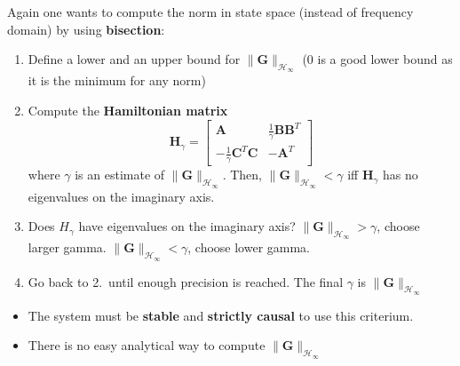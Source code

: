Again one wants to compute the norm in state space (instead of frequency domain) by using \textbf{bisection}:
\begin{enumerate}
    \item Define a lower and an upper bound for $\|\mathbf{G}\|_{\mathcal{H}_{\infty}}$ (0 is a good lower bound as it is the minimum for any norm)
    \item Compute the \textbf{Hamiltonian matrix}
          \begin{equation*}
              \mathbf{H}_{\gamma}=
              \begin{bmatrix}
                  \mathbf{A}                                & \frac{1}{\gamma}\mathbf{BB}^{T} \\
                  -\frac{1}{\gamma}\mathbf{C}^{T}\mathbf{C} & -\mathbf{A}^{T}
              \end{bmatrix}
          \end{equation*}
          where $\gamma$ is an estimate of $\|\mathbf{G}\|_{\mathcal{H}_{\infty}}$. Then, $\|\mathbf{G}\|_{\mathcal{H}_{\infty}}<\gamma$ iff $\mathbf{H}_{\gamma}$ has no eigenvalues on the imaginary axis.
    \item Does $H_{\gamma}$ have eigenvalues on the imaginary axis?
           $\|\mathbf{G}\|_{\mathcal{H}_{\infty}}>\gamma$, choose larger gamma.
           $\|\mathbf{G}\|_{\mathcal{H}_{\infty}}<\gamma$, choose lower gamma.
    \item Go back to 2.\ until enough precision is reached. The final $\gamma$ is $\|\mathbf{G}\|_{\mathcal{H}_{\infty}}$
\end{enumerate}


\begin{itemize}
    \item The system must be \textbf{stable} and \textbf{strictly causal} to use this criterium.
    \item There is no easy analytical way to compute $\|\mathbf{G}\|_{\mathcal{H}_{\infty}}$
\end{itemize}